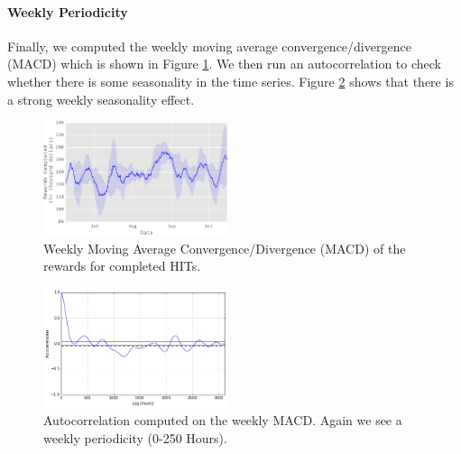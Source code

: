 \paragraph{Weekly Periodicity}
Finally, we computed the weekly moving average convergence/divergence (MACD) which is shown in Figure \ref{fig:mac}. We then run an autocorrelation to check whether there is some seasonality in the time series. Figure \ref{fig:autocorrelation2} shows that there is a strong weekly seasonality effect.
\begin{figure}[tb]
	\centering
		\includegraphics[width=0.48\textwidth]{figures/mac}
	\caption{Weekly Moving Average Convergence/Divergence (MACD) of the rewards for completed HITs.}
	\label{fig:mac}
\end{figure}
\begin{figure}[tb]
	\centering
		\includegraphics[width=0.48\textwidth]{figures/autocorrelation2}
	\caption{Autocorrelation computed on the weekly MACD. Again we see a weekly periodicity (0-250 Hours).}
	\label{fig:autocorrelation2}
\end{figure}